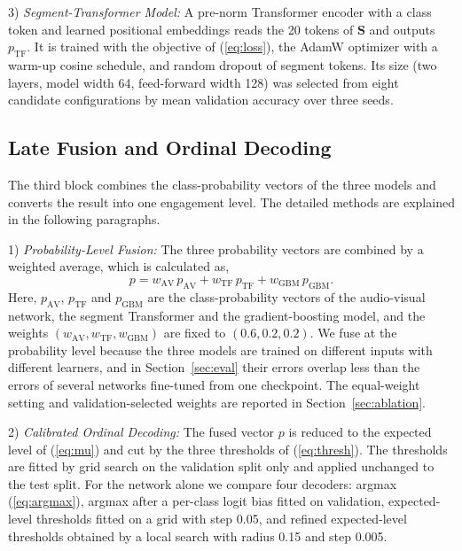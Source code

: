 \documentclass[journal]{IEEEtran}
\begin{document}
3) \emph{Segment-Transformer Model:} A pre-norm Transformer encoder with a class token and learned positional embeddings reads the 20 tokens of $\mathbf{S}$ and outputs $p_{\mathrm{TF}}$. It is trained with the objective of (\ref{eq:loss}), the AdamW optimizer with a warm-up cosine schedule, and random dropout of segment tokens. Its size (two layers, model width 64, feed-forward width 128) was selected from eight candidate configurations by mean validation accuracy over three seeds.

\subsection{Late Fusion and Ordinal Decoding}
\label{sec:method_fusion}

The third block combines the class-probability vectors of the three models and converts the result into one engagement level. The detailed methods are explained in the following paragraphs.

1) \emph{Probability-Level Fusion:} The three probability vectors are combined by a weighted average, which is calculated as,
\begin{equation}
p = w_{\mathrm{AV}}\, p_{\mathrm{AV}} + w_{\mathrm{TF}}\, p_{\mathrm{TF}} + w_{\mathrm{GBM}}\, p_{\mathrm{GBM}}. \label{eq:late}
\end{equation}
Here, $p_{\mathrm{AV}}$, $p_{\mathrm{TF}}$ and $p_{\mathrm{GBM}}$ are the class-probability vectors of the audio-visual network, the segment Transformer and the gradient-boosting model, and the weights $(w_{\mathrm{AV}}, w_{\mathrm{TF}}, w_{\mathrm{GBM}})$ are fixed to $(0.6, 0.2, 0.2)$. We fuse at the probability level because the three models are trained on different inputs with different learners, and in Section~\ref{sec:eval} their errors overlap less than the errors of several networks fine-tuned from one checkpoint. The equal-weight setting and validation-selected weights are reported in Section~\ref{sec:ablation}.

2) \emph{Calibrated Ordinal Decoding:} The fused vector $p$ is reduced to the expected level of (\ref{eq:mu}) and cut by the three thresholds of (\ref{eq:thresh}). The thresholds are fitted by grid search on the validation split only and applied unchanged to the test split. For the network alone we compare four decoders: argmax (\ref{eq:argmax}), argmax after a per-class logit bias fitted on validation, expected-level thresholds fitted on a grid with step 0.05, and refined expected-level thresholds obtained by a local search with radius 0.15 and step 0.005.
\end{document}
